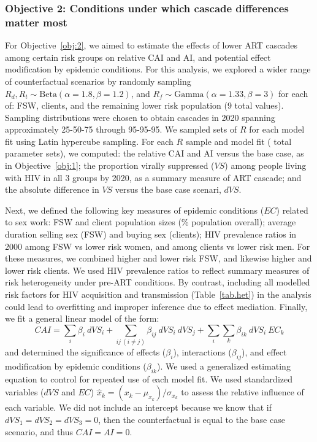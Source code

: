 \subsubsection{Objective 2: Conditions under which cascade differences matter most}\label{meth.obj.2}
For Objective~\ref{obj:2}, we aimed to estimate the effects of
lower ART cascades among certain risk groups on relative CAI and AI,
and potential effect modification by epidemic conditions.
For this analysis, we explored a wider range of counterfactual scenarios by randomly sampling
$R_d, R_t \sim \mathrm{Beta}(\alpha=1.8,\beta=1.2)$, and
$R_f \sim \mathrm{Gamma}(\alpha=1.33,\beta=3)$ for each of:
FSW, clients, and the remaining lower risk population (9 total values).
Sampling distributions were chosen to obtain cascades in 2020 spanning
approximately 25-50-75 through 95-95-95.
We sampled  sets of $R$ for each model fit using Latin hypercube sampling.
For each $R$ sample and model fit ( total parameter sets), we computed:
the relative CAI and AI versus the base case, as in Objective~\ref{obj:1};
the proportion virally suppressed ($VS$) among people living with HIV in all 3 groups by 2020,
as a summary measure of ART cascade; and 
the absolute difference in $VS$ versus the base case scenari, $dVS$.
\par
Next, we defined the following key measures of epidemic conditions ($EC$) related to sex work:
FSW and client population sizes (\% population overall);
average duration selling sex (FSW) and buying sex (clients);
HIV prevalence ratios in 2000 among FSW vs lower risk women, and among clients vs lower risk men.
For these measures, we combined higher and lower risk FSW, and likewise higher and lower risk clients.
We used HIV prevalence ratios to reflect
summary measures of risk heterogeneity under pre-ART conditions.
By contrast, including all modelled risk factors
for HIV acquisition and transmission (Table~\ref{tab.het})
in the analysis could lead to overfitting and improper inference due to effect mediation.
Finally, we fit a general linear model of the form:
\begin{equation}\label{eq:obj.2}
  CAI = \sum_i \beta_i~{dVS}_i
      + \sum_{ij~(i \ne j)} \beta_{ij}~{dVS}_i~{dVS}_j
      + \sum_i \sum_k \beta_{ik}~{dVS}_i~{EC}_k
\end{equation}
and determined the significance of effects ($\beta_i$), interactions ($\beta_{ij}$),
and effect modification by epidemic conditions ($\beta_{ik}$).
We used a generalized estimating equation to control for repeated use of each model fit.
We used standardized variables (${dVS}$ and $EC$)
$\hat{x}_k = (x_k - \mu_{x_k}) / \sigma_{x_k}$
to assess the relative influence of each variable.
We did not include an intercept because we know that if ${dVS}_1 = {dVS}_2 = {dVS}_3 = 0$, then
the counterfactual is equal to the base case scenario, and thus $CAI = AI = 0$.
